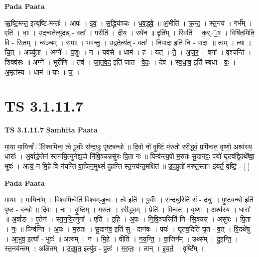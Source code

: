 \documentclass[17pt]{extarticle}
\begin{document}
\textbf{Pada Paata} \newline

ऋ॒ष्टि॒मन्त॒ इत्यृ॑ष्टि-मन्तः॑ । आपः॑ । इ॒व॒ । स॒द्ध्रिय॑ञ्चः । ध॒व॒द्ध्वे॒ ॥ अ॒भीति॑ । क्र॒न्द॒ । स्त॒नय॑ । गर्भ᳚म् । एति॑ । धाः॒ । उ॒द॒न्वतेत्यु॑दन्न् - वता᳚ । परीति॑ । दी॒य॒ । रथे॑न ॥ दृति᳚म् । स्विति॑ । क॒र्.॒ष॒ । विषि॑त॒मिति॒ वि - सि॒त॒म् । न्य॑ञ्चम् । स॒माः । भ॒व॒न्तु॒ । उ॒द्वतेत्य॑त् - वता᳚ । नि॒पा॒दा इति॑ नि - पा॒दाः ॥ त्वम् । त्या । चि॒त् । अच्यु॑ता । अग्ने᳚ । प॒शुः । न । यव॑से ॥ धाम॑ । ह॒ । यत् । ते॒ । अ॒ज॒र॒ । वना᳚ । वृ॒श्चन्ति॑ । शिक्व॑सः ॥ अग्ने᳚ । भूरी॑णि । तव॑ । जा॒त॒वे॒द॒ इति॑ जात - वे॒दः॒ । देव॑ । स्व॒धा॒व॒ इति॑ स्वधा - वः॒ । अ॒मृत॑स्य । धाम॑ ॥ याः । च॒ ।  \newline





\section{ TS 3.1.11.7 }

\textbf{TS 3.1.11.7 } \newline
\textbf{Samhita Paata} \newline

मा॒या मा॒यिनां᳚ ॅविश्वमिन्व॒ त्वे पू॒र्वीः स॑न्द॒धुः पृ॑ष्टबन्धो ॥ दि॒वो नो॑ वृ॒ष्टिं म॑रुतो ररीद्ध्वं॒ प्रपि॑न्वत॒ वृष्णो॒ अश्व॑स्य॒ धाराः᳚ । अ॒र्वाङे॒तेन॑ स्तनयि॒त्नुनेह्य॒पो नि॑षि॒ञ्चन्नसु॑रः पि॒ता नः॑ ॥ पिन्व॑न्त्य॒पो म॒रुतः॑ सु॒दान॑वः॒ पयो॑ घृ॒तव॑द्वि॒दथे᳚ष्वा॒ भुवः॑ । अत्यं॒ न मि॒हे वि न॑यन्ति वा॒जिन॒मुथ्सं॑ दुहन्ति स्त॒नय॑न्त॒मक्षि॑तं ॥ उ॒द॒प्रुतो॑ मरुत॒स्ताꣳ इ॑यर्त॒ वृष्टिं॒ - [  ] \newline

\textbf{Pada Paata} \newline

मा॒याः । मा॒यिना᳚म् । वि॒श्व॒मि॒न्वेति॑ विश्वम्-इ॒न्व॒ । त्वे इति॑ । पू॒र्वीः । स॒न्द॒धुरिति॑ सं - द॒धुः । पृ॒ष्ट॒ब॒न्धो॒ इति॑ पृष्ट - ब॒न्धो॒ ॥ दि॒वः । नः॒ । वृ॒ष्टिम् । म॒रु॒तः॒ । र॒री॒द्ध्व॒म् । प्रेति॑ । पि॒न्व॒त॒ । वृष्णः॑ । अश्व॑स्य । धाराः᳚ ॥ अ॒र्वाङ् । ए॒तेन॑ । स्त॒न॒यि॒त्नुना᳚ । एति॑ । इ॒हि॒ । अ॒पः । नि॒षि॒ञ्चन्निति॑ नि -सि॒ञ्चन्न् । असु॑रः । पि॒ता । नः॒ ॥ पिन्व॑न्ति । अ॒पः । म॒रुतः॑ । सु॒दान॑व॒ इति॑ सु - दान॑वः । पयः॑ । घृ॒तव॒दिति॑ घृ॒त - व॒त् । वि॒दथे॑षु । आ॒भुव॒ इत्या᳚ - भुवः॑ ॥ अत्य᳚म् । न । मि॒हे । वीति॑ । न॒य॒न्ति॒ । वा॒जिन᳚म् । उथ्स᳚म् । दु॒ह॒न्ति॒ । स्त॒नय॑न्तम् । अक्षि॑तम् ॥ उ॒द॒प्रुत॒ इत्यु॑द - प्रुतः॑ । म॒रु॒तः॒ । तान् । इ॒य॒र्त॒ । वृष्टि᳚म् ।  \newline
\end{document}
